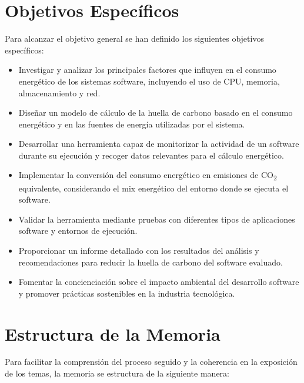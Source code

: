 \documentclass[12pt,a4paper]{report}
\begin{document}
\section{Objetivos Específicos}

Para alcanzar el objetivo general se han definido los siguientes objetivos
específicos:

\begin{itemize}
  \item Investigar y analizar los principales factores que influyen en el consumo
        energético de los sistemas software, incluyendo el uso de CPU, memoria,
        almacenamiento y red.
  \item Diseñar un modelo de cálculo de la huella de carbono basado en el consumo
        energético y en las fuentes de energía utilizadas por el sistema.
  \item Desarrollar una herramienta capaz de monitorizar la actividad de un software
        durante su ejecución y recoger datos relevantes para el cálculo energético.
  \item Implementar la conversión del consumo energético en emisiones de
        CO\textsubscript{2} equivalente, considerando el mix energético del entorno
        donde se ejecuta el software.
  \item Validar la herramienta mediante pruebas con diferentes tipos de aplicaciones
        software y entornos de ejecución.
  \item Proporcionar un informe detallado con los resultados del análisis y
        recomendaciones para reducir la huella de carbono del software evaluado.
  \item Fomentar la concienciación sobre el impacto ambiental del desarrollo software y
        promover prácticas sostenibles en la industria tecnológica.
\end{itemize}

\section{Estructura de la Memoria}

Para facilitar la comprensión del proceso seguido y la coherencia en la
exposición de los temas, la memoria se estructura de la siguiente manera:
\end{document}

